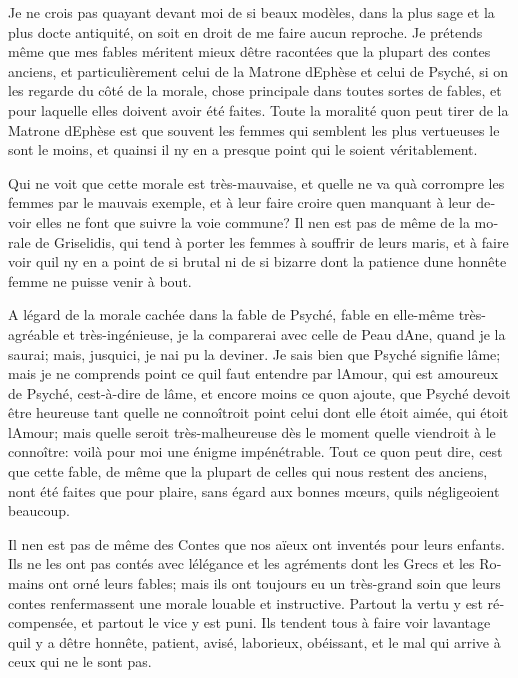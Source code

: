 \documentclass[14pt,a4paper]{memoir}
\begin{document}
\begin{otherlanguage}{french}
Je ne crois pas qu\textquotesingle ayant devant moi de si beaux modèles,
dans la plus sage et la plus docte antiquité, on soit en droit de me
faire aucun reproche. Je prétends même que mes fables méritent mieux
d\textquotesingle être racontées que la plupart des contes anciens, et
particulièrement celui de la Matrone d\textquotesingle Ephèse et celui
de Psyché, si on les regarde du côté de la morale, chose principale dans
toutes sortes de fables, et pour laquelle elles doivent avoir été
faites. Toute la moralité qu\textquotesingle on peut tirer de la Matrone
d\textquotesingle Ephèse est que souvent les femmes qui semblent les
plus vertueuses le sont le moins, et qu\textquotesingle ainsi il
n\textquotesingle y en a presque point qui le soient véritablement.

Qui ne voit que cette morale est très-mauvaise, et
qu\textquotesingle elle ne va qu\textquotesingle à corrompre les femmes
par le mauvais exemple, et à leur faire croire qu\textquotesingle en
manquant à leur devoir elles ne font que suivre la voie commune? Il
n\textquotesingle en est pas de même de la morale de Griselidis, qui
tend à porter les femmes à souffrir de leurs maris, et à faire voir
qu\textquotesingle il n\textquotesingle y en a point de si brutal ni de
si bizarre dont la patience d\textquotesingle une honnête femme ne
puisse venir à bout.

A l\textquotesingle égard de la morale cachée dans la fable de Psyché,
fable en elle-même très-agréable et très-ingénieuse, je la comparerai
avec celle de Peau d\textquotesingle Ane, quand je la saurai; mais,
jusqu\textquotesingle ici, je n\textquotesingle ai pu la deviner. Je
sais bien que Psyché signifie l\textquotesingle âme; mais je ne
comprends point ce qu\textquotesingle il faut entendre par
l\textquotesingle Amour, qui est amoureux de Psyché,
c\textquotesingle est-à-dire de l\textquotesingle âme, et encore moins
ce qu\textquotesingle on ajoute, que Psyché devoit être heureuse tant
qu\textquotesingle elle ne connoîtroit point celui dont elle étoit
aimée, qui étoit l\textquotesingle Amour; mais qu\textquotesingle elle
seroit très-malheureuse dès le moment qu\textquotesingle elle viendroit
à le connoître: voilà pour moi une énigme impénétrable. Tout ce
qu\textquotesingle on peut dire, c\textquotesingle est que cette fable,
de même que la plupart de celles qui nous restent des anciens,
n\textquotesingle ont été faites que pour plaire, sans égard aux bonnes
mœurs, qu\textquotesingle ils négligeoient beaucoup.

Il n\textquotesingle en est pas de même des Contes que nos aïeux ont
inventés pour leurs enfants. Ils ne les ont pas contés avec
l\textquotesingle élégance et les agréments dont les Grecs et les
Romains ont orné leurs fables; mais ils ont toujours eu un très-grand
soin que leurs contes renfermassent une morale louable et instructive.
Partout la vertu y est récompensée, et partout le vice y est puni. Ils
tendent tous à faire voir l\textquotesingle avantage
qu\textquotesingle il y a d\textquotesingle être honnête, patient,
avisé, laborieux, obéissant, et le mal qui arrive à ceux qui ne le sont
pas.


\end{otherlanguage}
\end{document}
